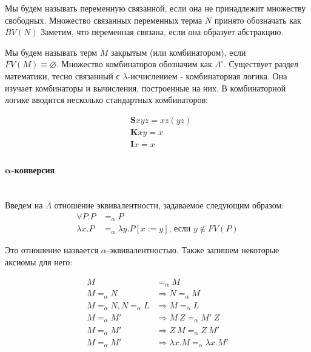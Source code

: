 \documentclass[lambda.tex]{subfiles}
\begin{document}
Мы будем называть переменную связанной, если она не принадлежит множеству свободных. Множество связанных переменных терма $N$ принято обозначать как $BV(N)$ Заметим, что переменная связана, если она образует абстракцию.

Мы будем называть терм $M$ закрытым (или комбинатором), если\\ \(FV(M) \equiv \varnothing\). Множество комбинаторов обозначим как $\Lambda^\circ$. Существует раздел математики, тесно связанный с $\lambda$-исчислением - комбинаторная логика. Она изучает комбинаторы и вычисления, построенные на них. В комбинаторной логике вводится несколько стандартных комбинаторов:

\begin{align*}
	&\boldsymbol{S}xyz = xz(yz)\\
	&\boldsymbol{K}xy = x\\
    &\boldsymbol{I}x = x\\
\end{align*}

\newpage
\paragraph{$\boldsymbol{\alpha}$-конверсия} %
\label{par:aplha conversion} ~\\

Введем на $\Lambda$ отношение эквивалентности, задаваемое следующим образом:
\begin{align*}
	\forall P.P &=_\alpha P\\
	\lambda x.P &=_\alpha \lambda y.P[x:=y] \text{, если } y \not\in FV(P)
\end{align*}

Это отношение назвается $\alpha$-эквивалентностью. Также запишем некоторые аксиомы для него:

\begin{align*}
	M &=_\alpha M\\
	M =_\alpha N &\Rightarrow N =_\alpha M\\
	M =_\alpha N, N =_\alpha L &\Rightarrow M =_\alpha L\\
	M =_\alpha M' &\Rightarrow M\ Z =_\alpha M'\ Z\\
	M =_\alpha M' &\Rightarrow Z\ M =_\alpha Z\ M'\\
	M =_\alpha M' &\Rightarrow \lambda x.M =_\alpha \lambda x.M'
\end{align*}
\end{document}
